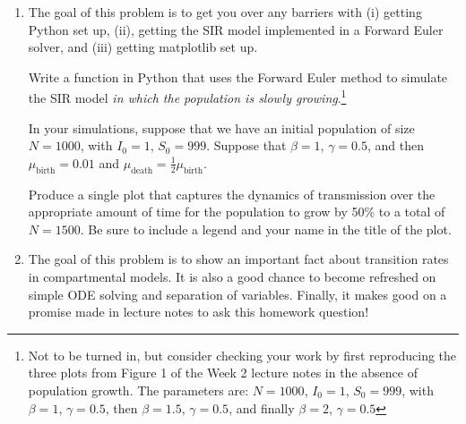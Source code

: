 \documentclass[11pt]{article}
\begin{document}
\begin{enumerate}

\item The goal of this problem is to get you over any barriers with (i) getting Python set up, (ii), getting the SIR model implemented in a Forward Euler solver, and (iii) getting matplotlib set up.
	
	Write a function in Python that uses the Forward Euler method to simulate the SIR model {\it in which the population is slowly growing}.\footnote{Not to be turned in, but consider checking your work by first reproducing the three plots from Figure 1 of the Week 2 lecture notes in the absence of population growth. The parameters are: $N=1000$, $I_0=1$, $S_0=999$, with $\beta=1$, $\gamma=0.5$, then $\beta = 1.5$, $\gamma=0.5$, and finally $\beta = 2$, $\gamma=0.5$}
	
	In your simulations, suppose that we have an initial population of size $N=1000$, with $I_0=1$, $S_0=999$. Suppose that $\beta=1$, $\gamma=0.5$, and then $\mu_{\text{birth}}=0.01$ and $\mu_{\text{death}} = \tfrac{1}{2} \mu_\text{birth}$. 
	
	Produce a single plot that captures the dynamics of transmission over the appropriate amount of time for the population to grow by 50\% to a total of $N=1500$. Be sure to include a legend and your name in the title of the plot.
	
\clearpage
\item The goal of this problem is to show an important fact about transition rates in compartmental models. It is also a good chance to become refreshed on simple ODE solving and separation of variables. Finally, it makes good on a promise made in lecture notes to ask this homework question!
	

\end{enumerate}
\end{document}
